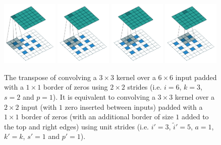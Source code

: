 \documentclass{report}
\begin{document}
\begin{figure}[p]
    \centering
    \includegraphics[width=0.24\textwidth]{pdf/padding_strides_odd_transposed_00.pdf}
    \includegraphics[width=0.24\textwidth]{pdf/padding_strides_odd_transposed_01.pdf}
    \includegraphics[width=0.24\textwidth]{pdf/padding_strides_odd_transposed_02.pdf}
    \includegraphics[width=0.24\textwidth]{pdf/padding_strides_odd_transposed_03.pdf}
    \caption{\label{fig:padding_strides_odd_transposed} The transpose of
        convolving a $3 \times 3$ kernel over a $6 \times 6$ input padded with a
        $1 \times 1$ border of zeros using $2 \times 2$ strides (i.e. $i = 6$,
        $k = 3$, $s = 2$ and $p = 1$). It is equivalent to convolving a $3
        \times 3$ kernel over a $2 \times 2$ input (with $1$ zero inserted
        between inputs) padded with a $1 \times 1$ border of zeros (with an
        additional border of size $1$ added to the top and right edges) using
        unit strides (i.e. $i' = 3$, $\tilde{i}' = 5$, $a = 1$, $k' = k$, $s' =
        1$ and $p' = 1$).}
\end{figure}



\end{document}
